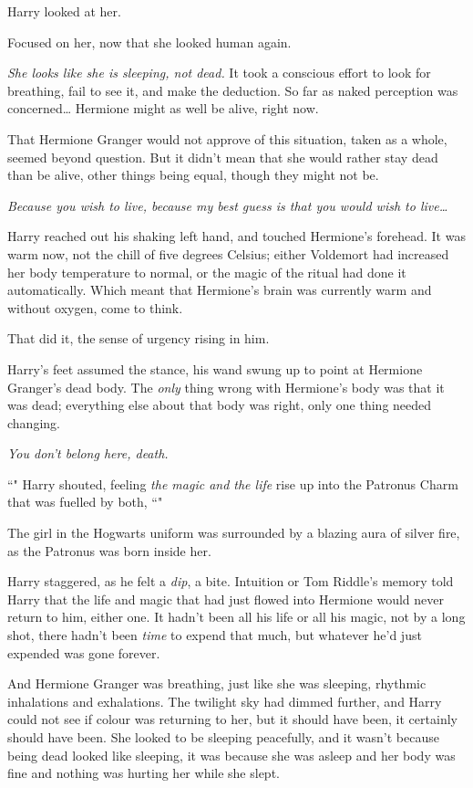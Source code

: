 Harry looked at her.

Focused on her, now that she looked human again.

\emph{She looks like she is sleeping, not dead.} It took a conscious effort to look for breathing, fail to see it, and make the deduction. So far as naked perception was concerned{\ldots} Hermione might as well be alive, right now.

That Hermione Granger would not approve of this situation, taken as a whole, seemed beyond question. But it didn't mean that she would rather stay dead than be alive, other things being equal, though they might not be.

\emph{Because you wish to live, because my best guess is that you would wish to live{\ldots}}

Harry reached out his shaking left hand, and touched Hermione's forehead. It was warm now, not the chill of five degrees Celsius; either Voldemort had increased her body temperature to normal, or the magic of the ritual had done it automatically. Which meant that Hermione's brain was currently warm and without oxygen, come to think.

That did it, the sense of urgency rising in him.

Harry's feet assumed the stance, his wand swung up to point at Hermione Granger's dead body. The \emph{only} thing wrong with Hermione's body was that it was dead; everything else about that body was right, only one thing needed changing.

\emph{You don't belong here, death.}

``" Harry shouted, feeling \emph{the magic and the life} rise up into the Patronus Charm that was fuelled by both, ``"

The girl in the Hogwarts uniform was surrounded by a blazing aura of silver fire, as the Patronus was born inside her.

Harry staggered, as he felt a \emph{dip}, a bite. Intuition or Tom Riddle's memory told Harry that the life and magic that had just flowed into Hermione would never return to him, either one. It hadn't been all his life or all his magic, not by a long shot, there hadn't been \emph{time} to expend that much, but whatever he'd just expended was gone forever.

And Hermione Granger was breathing, just like she was sleeping, rhythmic inhalations and exhalations. The twilight sky had dimmed further, and Harry could not see if colour was returning to her, but it should have been, it certainly should have been. She looked to be sleeping peacefully, and it wasn't because being dead looked like sleeping, it was because she was asleep and her body was fine and nothing was hurting her while she slept.

